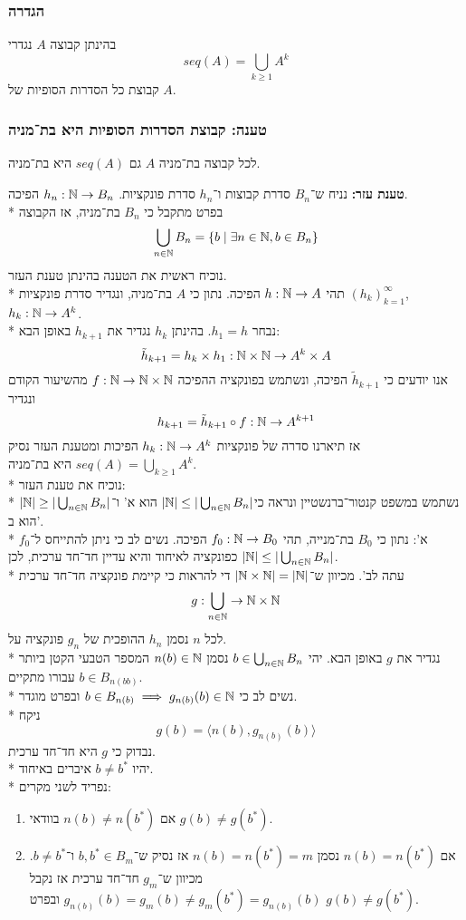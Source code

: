 \subsubsection{הגדרה}
בהינתן קבוצה $A$ נגדרי 
\[
	seq(A) = \bigcup_{k \ge 1} A^k
\]
קבוצת כל הסדרות הסופיות של $A$.

\subsubsection{טענה: קבוצת הסדרות הסופיות היא בת־מניה}
לכל קבוצה בת־מניה $A$ גם $seq(A)$ היא בת־מניה.

\textbf{טענת עזר:} נניח ש־$B_n$ סדרת קבוצות ו־$h_n$ סדרת פונקציות. $h_n : \mathbb{N} \to B_n$ הפיכה.\\*
בפרט מתקבל כי $B_n$ בת־מניה, אז הקבוצה
\[
	\bigcup_{n \in \mathbb{N}} B_n = \{ b \mid \exists n \in \mathbb{N}, b \in B_n \}
\]
נוכיח ראשית את הטענה בהינתן טענת העזר. \\*
תהי $h : \mathbb{N} \to A$ הפיכה.
נתון כי $A$ בת־מניה, ונגדיר סדרת פונקציות ${(h_k)}_{k = 1}^\infty$, $h_k : \mathbb{N} \to A^k$. \\*
נבחר $h_1 = h$. בהינתן $h_k$ נגדיר את $h_{k + 1}$ באופן הבא:
\[
	\tilde{h}_{k + 1} = h_k \times h_1 : \mathbb{N} \times \mathbb{N} \to A^k \times A
\]
אנו יודעים כי $\tilde{h}_{k + 1}$ הפיכה, ונשתמש בפונקציה ההפיכה $f : \mathbb{N} \to \mathbb{N} \times \mathbb{N}$ מהשיעור הקודם ונגדיר
\[
	h_{k + 1} = \tilde{h}_{k + 1} \circ f : \mathbb{N} \to A^{k + 1}
\]
אז תיארנו סדרה של פונקציות $h_k : \mathbb{N} \to A^k$ הפיכות ומטענת העזר נסיק $seq(A) = \bigcup_{k \ge 1} A^k$ היא בת־מניה. \\*
נוכיח את טענת העזר: \\*
נשתמש במשפט קנטור־ברנשטיין ונראה כי$|\mathbb{N}| \le | \bigcup_{n \in \mathbb{N}}B_n|$ הוא א' ו־$|\mathbb{N}| \ge | \bigcup_{n \in \mathbb{N}}B_n|$ הוא ב'. \\*
א': נתון כי $B_0$ בת־מנייה, תהי $f_0 : \mathbb{N} \to B_0$ הפיכה. נשים לב כי ניתן להתייחס ל־$f_0$ כפונקציה לאיחוד והיא עדיין חד־חד ערכית, לכן $|\mathbb{N}| \le | \bigcup_{n \in \mathbb{N}}B_n|$. \\*
עתה לב'. מכיוון ש־$|\mathbb{N} \times \mathbb{N}| = |\mathbb{N}|$ די להראות כי קיימת פונקציה חד־חד ערכית
\[
	g : \bigcup_{n \in \mathbb{N}} \to \mathbb{N} \times \mathbb{N}
\]
לכל $n$ נסמן $h_n$ ההופכית של $g_n$ פונקציה על. \\*
נגדיר את $g$ באופן הבא. יהי $b \in \bigcup_{n \in \mathbb{N}} B_n$ נסמן $n(b) \in \mathbb{N}$ המספר הטבעי הקטן ביותר עבורו מתקיים $b \in B_{n(bb)}$. \\*
נשים לב כי $b \in B_{n(b)} \implies g_{n(b)}(b) \in \mathbb{N}$ ובפרט מוגדר. \\*
ניקח
\[
	g(b) = \langle n(b), g_{n(b)}(b) \rangle
\]
נבדוק כי $g$ היא חד־חד ערכית. \\*
יהיו $b \ne b^*$ איברים באיחוד. \\*
נפריד לשני מקרים:
\begin{enumerate}
	\item אם $n(b) \ne n(b^*)$ בוודאי $g(b) \ne g(b^*)$.
	\item אם $n(b) = n(b^*)$ נסמן $n(b) = n(b^*) = m$ אז נסיק ש־$b, b^* \in B_m$ ו־$b \ne b^*$. מכיוון ש־$g_m$ חד־חד ערכית אז נקבל $g_{n(b)}(b) = g_m(b) \ne g_m(b^*) = g_{n(b)}(b)$ ובפרט $g(b) \ne g(b^*)$.
\end{enumerate}

